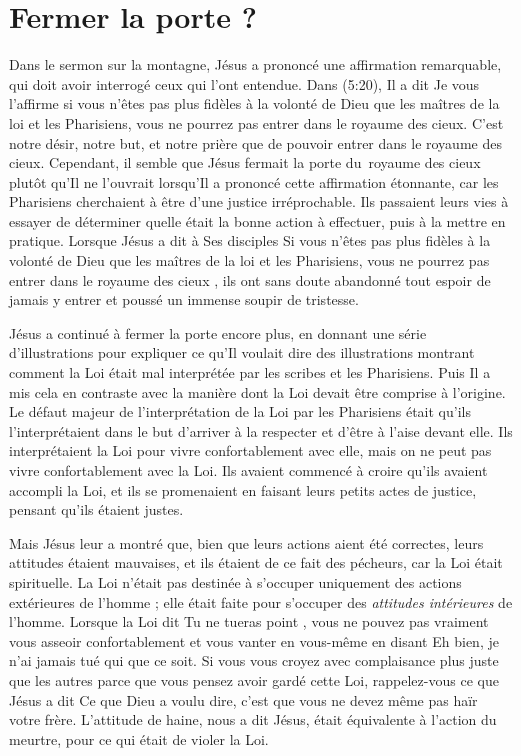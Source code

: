 \section{Fermer la porte ?}

Dans le sermon sur la montagne, Jésus a prononcé une affirmation remarquable,
 qui doit avoir interrogé ceux qui l'ont entendue.
 Dans (5:20), Il a dit\frcolon{}
 \Og Je vous l'affirme\frcolon{}
 si vous n'êtes pas plus fidèles à la volonté de Dieu
 que les maîtres de la loi et les Pharisiens,
 vous ne pourrez pas entrer dans le royaume des cieux. \Fg{}
 C'est notre désir, notre but, et notre prière que de pouvoir entrer
 dans le royaume des cieux.
 Cependant, il semble que Jésus fermait la porte du~royaume des cieux
 plutôt qu'Il ne l'ouvrait lorsqu'Il a prononcé cette affirmation étonnante,
 car les Pharisiens cherchaient à être d'une justice irréprochable.
 Ils passaient leurs vies à essayer de déterminer quelle était
 la bonne action à effectuer,
 puis à la mettre en pratique.
 Lorsque Jésus a dit à Ses disciples\frcolon{}
 \Og Si vous n'êtes pas plus fidèles à la volonté de Dieu que
 les maîtres de la loi et les Pharisiens, vous ne pourrez pas
 entrer dans le royaume des cieux \Fg{},
 ils ont sans doute abandonné tout espoir de jamais y entrer
 et poussé un immense soupir de tristesse.

Jésus a continué à fermer la porte encore plus,
 en donnant une série d'illustrations pour expliquer
 ce qu'Il voulait dire \ocadr des illustrations montrant comment la Loi
 était mal interprétée par les scribes et les Pharisiens.
 Puis Il a mis cela en contraste avec la manière dont la Loi
 devait être comprise à l'origine.
 Le défaut majeur de l'interpré\-ta\-tion de la Loi par les Pharisiens
 était qu'ils l'interprétaient dans le but d'arriver à la respecter
 et d'être à l'aise devant elle.
 Ils interprétaient la Loi pour vivre confortablement avec elle,
 mais on ne peut pas vivre confortablement avec la Loi.
 Ils avaient commencé à croire qu'ils avaient accompli la Loi,
 et ils se promenaient en faisant leurs petits actes de justice,
 pensant qu'ils étaient justes.

Mais Jésus leur a montré que, bien que leurs actions
 aient été correctes, leurs attitudes étaient mauvaises,
 et ils étaient de ce fait des pécheurs,
 car la Loi était spirituelle.
 La Loi n'était pas destinée à s'occuper uniquement des actions extérieures
 de l'homme ; elle était faite pour s'occuper
 des \emph{attitudes intérieures} de l'homme.
 Lorsque la Loi dit\frcolon{} \Og Tu ne tueras point \Fg{},
 vous ne pouvez pas vraiment vous asseoir confortablement et vous vanter
 en vous-même en disant\frcolon{}
 \Og Eh bien, je n'ai jamais tué qui que ce soit. \Fg{}
 Si vous vous croyez avec complaisance plus juste que les autres parce que vous pensez
 avoir gardé cette Loi, rappelez-vous ce que Jésus a dit\frcolon{}
 \Og Ce que Dieu a voulu dire, c'est que vous ne devez même pas
 haïr votre frère. \Fg{}
 L'attitude de haine, nous a dit Jésus,
 était équivalente à l'action du meurtre,
 pour ce qui était de violer la Loi.

